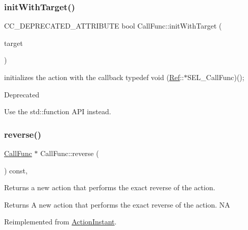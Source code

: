 \subsubsection{\texorpdfstring{init\+With\+Target()}{initWithTarget()}\hspace{0.1cm}{\footnotesize\ttfamily [2/2]}}
{\footnotesize\ttfamily C\+C\+\_\+\+D\+E\+P\+R\+E\+C\+A\+T\+E\+D\+\_\+\+A\+T\+T\+R\+I\+B\+U\+TE bool Call\+Func\+::init\+With\+Target (\begin{DoxyParamCaption}\item[{\hyperlink{classRef}{Ref} $\ast$}]{target }\end{DoxyParamCaption})}

initializes the action with the callback typedef void (\hyperlink{classRef}{Ref}\+:\+:$\ast$\+S\+E\+L\+\_\+\+Call\+Func)(); \begin{DoxyRefDesc}{Deprecated}
\item[\hyperlink{deprecated__deprecated000244}{Deprecated}]Use the std\+::function A\+PI instead. \end{DoxyRefDesc}
\mbox{\label{classCallFunc_a5c39f0a5cc14916897280a4a37cc7125}} 
\subsubsection{\texorpdfstring{reverse()}{reverse()}\hspace{0.1cm}{\footnotesize\ttfamily [1/2]}}
{\footnotesize\ttfamily \hyperlink{classCallFunc}{Call\+Func} $\ast$ Call\+Func\+::reverse (\begin{DoxyParamCaption}\item[{void}]{ }\end{DoxyParamCaption}) const\hspace{0.3cm}{\ttfamily [override]}, {\ttfamily [virtual]}}

Returns a new action that performs the exact reverse of the action.

\begin{DoxyReturn}{Returns}
A new action that performs the exact reverse of the action.  NA 
\end{DoxyReturn}


Reimplemented from \hyperlink{classActionInstant_aeb1870802c509e1f4111c863a28e9262}{Action\+Instant}.

\mbox{\label{classCallFunc_aed2cda04eeffe75361b92ef8b15127eb}} 
